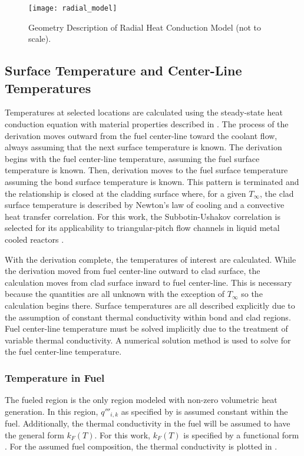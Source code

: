     \begin{figure}
      \centering
      \texttt{[image: radial\_model]}
      \caption{Geometry Description of Radial Heat Conduction Model (not to
        scale).}
      \label{fig:radial_model}
    \end{figure}

  \subsection{Surface Temperature and Center-Line Temperatures}
    \label{sec:surface_temps}
    Temperatures at selected locations are calculated using the steady-state
    heat conduction equation with material properties described in
    . The process of the derivation moves outward
    from the fuel center-line toward the coolant flow, always assuming that the
    next surface temperature is known. The derivation begins with the fuel 
    center-line temperature, assuming the fuel surface temperature is known. 
    Then, derivation moves to the fuel surface temperature assuming the bond 
    surface temperature is known. This pattern is terminated and the 
    relationship is closed at the cladding surface where, for a given 
    $T_{\infty}$, the clad surface temperature is described by Newton's law of 
    cooling and a convective heat transfer correlation. For this work, the 
    Subbotin-Ushakov correlation is selected for its applicability to 
    triangular-pitch flow channels in liquid metal cooled reactors 
    \cite{subbotinUshakov}.

    With the derivation complete, the temperatures of interest are calculated.
    While the derivation moved from fuel center-line outward to clad surface,
    the calculation moves from clad surface inward to fuel center-line. This is
    necessary because the quantities are all unknown with the exception of
    $T_{\infty}$ so the calculation begins there. Surface temperatures are all
    described explicitly due to the assumption of constant thermal conductivity
    within bond and clad regions. Fuel center-line temperature must be solved
    implicitly due to the treatment of variable thermal conductivity. A
    numerical solution method is used to solve for the fuel center-line
    temperature.
    
    \subsubsection{Temperature in Fuel}
      The fueled region is the only region modeled with non-zero volumetric heat
      generation. In this region, $q'''_{i,k}$ as specified by 
       is assumed constant within the fuel. 
      Additionally, the thermal conductivity in the fuel will be assumed to have
      the general form $k_F(T)$. For this work, $k_F(T)$ is specified by a
      functional form \cite{fuelProp}. For the assumed fuel composition, 
      the thermal conductivity is plotted in .

